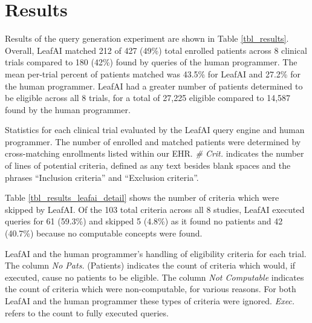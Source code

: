 \documentclass[../main.tex]{subfiles}
\begin{document}
\begin{enumerate}
\end{enumerate}

\section{Results}

Results of the query generation experiment are shown in Table \ref{tbl_results}. Overall, LeafAI matched 212 of 427 (49\%) total enrolled patients across 8 clinical trials compared to 180 (42\%) found by queries of the human programmer. The mean per-trial percent of patients matched was 43.5\% for LeafAI and 27.2\% for the human programmer. LeafAI had a greater number of patients determined to be eligible across all 8 trials, for a total of 27,225 eligible compared to 14,587 found by the human programmer. 

\begin{table}[h!]
    \small
    \centering
    
    \caption{Statistics for each clinical trial evaluated by the LeafAI query engine and human programmer. The number of enrolled and matched patients were determined by cross-matching enrollments listed within our EHR. \textit{\# Crit.} indicates the number of lines of potential criteria, defined as any text besides blank spaces and the phrases “Inclusion criteria” and “Exclusion criteria”.}
    \label{tbl_results}
\end{table} 

Table \ref{tbl_results_leafai_detail} shows the number of criteria which were skipped by LeafAI. Of the 103 total criteria across all 8 studies, LeafAI executed queries for 61 (59.3\%) and skipped 5 (4.8\%) as it found no patients and 42 (40.7\%) because no computable concepts were found. 

\begin{table}[h!]
    \footnotesize
    \centering
    
    \caption{LeafAI and the human programmer’s handling of eligibility criteria for each trial. The column \textit{No Pats.} (Patients) indicates the count of criteria which would, if executed, cause no patients to be eligible. The column \textit{Not Computable} indicates the count of criteria which were non-computable, for various reasons. For both LeafAI and the human programmer these types of criteria were ignored. \textit{Exec.} refers to the count to fully executed queries.}
    \label{tbl_results_leafai_detail}
\end{table} 
\end{document}
